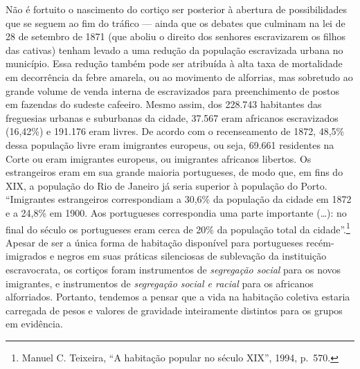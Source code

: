 Não é fortuito o nascimento do cortiço ser posterior à abertura de
possibilidades que se seguem ao fim do tráfico --- ainda que os debates
que culminam na lei de 28 de setembro de 1871 (que aboliu o direito dos
senhores escravizarem os filhos das cativas) tenham levado a uma redução
da população escravizada urbana no município. Essa redução também pode
ser atribuída à alta taxa de mortalidade em decorrência da febre
amarela, ou ao movimento de alforrias, mas sobretudo ao grande volume de
venda interna de escravizados para preenchimento de postos em fazendas
do sudeste cafeeiro. Mesmo assim, dos 228.743 habitantes das freguesias
urbanas e suburbanas da cidade, 37.567 eram africanos escravizados
(16,42\%) e 191.176 eram livres. De acordo com o recenseamento de 1872,
48,5\% dessa população livre eram imigrantes europeus, ou seja, 69.661
residentes na Corte ou eram imigrantes europeus, ou imigrantes africanos
libertos. Os estrangeiros eram em sua grande maioria portugueses, de
modo que, em fins do XIX, a população do Rio de Janeiro já seria
superior à população do Porto. ``Imigrantes estrangeiros correspondiam a
30,6\% da população da cidade em 1872 e a 24,8\% em 1900. Aos
portugueses correspondia uma parte importante (\dots{}): no final do século
os portugueses eram cerca de 20\% da população total da
cidade''.\footnote{Manuel C. Teixeira, ``A habitação popular no século
  XIX'', 1994, p.~570.} Apesar de ser a única forma de habitação
disponível para portugueses recém-imigrados e negros em suas práticas
silenciosas de sublevação da instituição escravocrata, os cortiços foram
instrumentos de \textit{segregação social} para os novos imigrantes, e
instrumentos de \textit{segregação social e racial} para os africanos
alforriados. Portanto, tendemos a pensar que a vida na habitação
coletiva estaria carregada de pesos e valores de gravidade inteiramente
distintos para os grupos em evidência.

